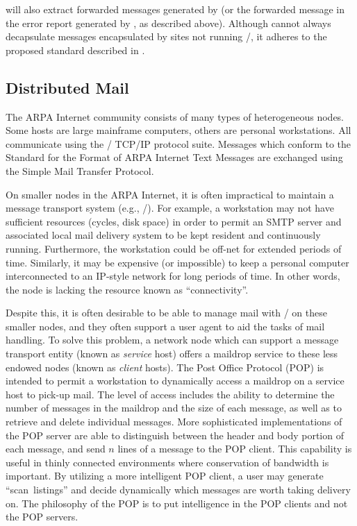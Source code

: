  will also extract forwarded messages generated by 
(or the forwarded message in the error report generated by ,
as described above).
Although  cannot always decapsulate
messages encapsulated by sites not running \MH/,
it adheres to the proposed standard described in \cite{MRose85b}.

\subsection{Distributed Mail}			%
The ARPA Internet community consists of many types of heterogeneous nodes.
Some hosts are large mainframe computers,
others are personal workstations.
All communicate using the \milstd/ TCP/IP protocol suite\cite{IP,TCP}.
Messages which conform to the Standard for the Format of ARPA Internet Text
Messages\cite{DCroc82}
are exchanged using the Simple Mail Transfer Protocol\cite{SMTP}.

On smaller nodes in the ARPA Internet,
it is often impractical to maintain
a message transport system (e.g., \SendMail/).
For example,
a workstation may not have sufficient resources (cycles, disk space)
in order to permit an SMTP server and associated local mail delivery system
to be kept resident and continuously running.
Furthermore,
the workstation could be off-net for extended periods of time.
Similarly,
it may be expensive (or impossible) to keep a personal computer
interconnected to an IP-style network for long periods of time.
In other words,
the node is lacking the resource known as ``connectivity''.

Despite this,
it is often desirable to be able to manage mail with \MH/ on these smaller
nodes,
and they often support a user agent to aid the tasks of mail handling.
To solve this problem,
a network node which can support a message transport entity
(known as {\it service} host) offers
a maildrop service to these less endowed nodes
(known as {\it client} hosts).
The Post Office Protocol\cite{JReyn84} (POP) is intended to permit a
workstation to dynamically access a maildrop on a service host to pick-up
mail.%
The level of access includes the ability to
determine the number of messages in the maildrop and the size of each message,
as well as to retrieve and delete individual messages.
More sophisticated implementations of the POP server
are able to distinguish between the header and body portion of each message,
and send $n$ lines of a message to the POP client.
This capability is useful in thinly connected environments where conservation
of bandwidth is important.
By utilizing a more intelligent POP client,
a user may generate ``scan~listings'' and decide dynamically which messages
are worth taking delivery on.
The philosophy of the POP is to put intelligence in the 
POP clients and not the POP servers.

